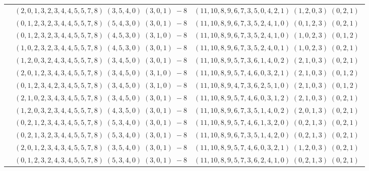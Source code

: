 \documentclass[11pt]{article}
\begin{document}
\begin{longtable}[l]{|c|c|c|}
 \cline{2-3} 
 & $(2 ,0 ,1 ,3 ,2 ,3 ,4 ,4 ,5 ,5 ,7 ,8) \;(3 ,5 ,4 ,0) \;(3 ,0 ,1) \;-8$ & $(11 ,10 ,8 ,9 ,6 ,7 ,3 ,5 ,0 ,4 ,2 ,1) \;(1 ,2 ,0 ,3) \;(0 ,2 ,1) \;$\\ 
 \cline{2-3} 
 & $(0 ,1 ,2 ,3 ,2 ,3 ,4 ,4 ,5 ,5 ,7 ,8) \;(5 ,4 ,3 ,0) \;(3 ,0 ,1) \;-8$ & $(11 ,10 ,8 ,9 ,6 ,7 ,3 ,5 ,2 ,4 ,1 ,0) \;(0 ,1 ,2 ,3) \;(0 ,2 ,1) \;$\\ 
 \cline{2-3} 
 & $(0 ,1 ,2 ,3 ,2 ,3 ,4 ,4 ,5 ,5 ,7 ,8) \;(4 ,5 ,3 ,0) \;(3 ,1 ,0) \;-8$ & $(11 ,10 ,8 ,9 ,6 ,7 ,3 ,5 ,2 ,4 ,1 ,0) \;(1 ,0 ,2 ,3) \;(0 ,1 ,2) \;$\\ 
 \cline{2-3} 
 & $(1 ,0 ,2 ,3 ,2 ,3 ,4 ,4 ,5 ,5 ,7 ,8) \;(4 ,5 ,3 ,0) \;(3 ,0 ,1) \;-8$ & $(11 ,10 ,8 ,9 ,6 ,7 ,3 ,5 ,2 ,4 ,0 ,1) \;(1 ,0 ,2 ,3) \;(0 ,2 ,1) \;$\\ 
 \cline{2-3} 
 & $(1 ,2 ,0 ,3 ,2 ,4 ,3 ,4 ,5 ,5 ,7 ,8) \;(3 ,4 ,5 ,0) \;(3 ,0 ,1) \;-8$ & $(11 ,10 ,8 ,9 ,5 ,7 ,3 ,6 ,1 ,4 ,0 ,2) \;(2 ,1 ,0 ,3) \;(0 ,2 ,1) \;$\\ 
 \cline{2-3} 
 & $(2 ,0 ,1 ,2 ,3 ,4 ,3 ,4 ,5 ,5 ,7 ,8) \;(3 ,4 ,5 ,0) \;(3 ,1 ,0) \;-8$ & $(11 ,10 ,8 ,9 ,5 ,7 ,4 ,6 ,0 ,3 ,2 ,1) \;(2 ,1 ,0 ,3) \;(0 ,1 ,2) \;$\\ 
 \cline{2-3} 
 & $(0 ,1 ,2 ,3 ,4 ,2 ,3 ,4 ,5 ,5 ,7 ,8) \;(3 ,4 ,5 ,0) \;(3 ,1 ,0) \;-8$ & $(11 ,10 ,8 ,9 ,4 ,7 ,3 ,6 ,2 ,5 ,1 ,0) \;(2 ,1 ,0 ,3) \;(0 ,1 ,2) \;$\\ 
 \cline{2-3} 
 & $(2 ,1 ,0 ,2 ,3 ,4 ,3 ,4 ,5 ,5 ,7 ,8) \;(3 ,4 ,5 ,0) \;(3 ,0 ,1) \;-8$ & $(11 ,10 ,8 ,9 ,5 ,7 ,4 ,6 ,0 ,3 ,1 ,2) \;(2 ,1 ,0 ,3) \;(0 ,2 ,1) \;$\\ 
 \cline{2-3} 
 & $(1 ,2 ,0 ,3 ,2 ,3 ,4 ,4 ,5 ,5 ,7 ,8) \;(4 ,3 ,5 ,0) \;(3 ,0 ,1) \;-8$ & $(11 ,10 ,8 ,9 ,6 ,7 ,3 ,5 ,1 ,4 ,0 ,2) \;(2 ,0 ,1 ,3) \;(0 ,2 ,1) \;$\\ 
 \cline{2-3} 
 & $(0 ,2 ,1 ,2 ,3 ,4 ,3 ,4 ,5 ,5 ,7 ,8) \;(5 ,3 ,4 ,0) \;(3 ,0 ,1) \;-8$ & $(11 ,10 ,8 ,9 ,5 ,7 ,4 ,6 ,1 ,3 ,2 ,0) \;(0 ,2 ,1 ,3) \;(0 ,2 ,1) \;$\\ 
 \cline{2-3} 
 & $(0 ,2 ,1 ,3 ,2 ,3 ,4 ,4 ,5 ,5 ,7 ,8) \;(5 ,3 ,4 ,0) \;(3 ,0 ,1) \;-8$ & $(11 ,10 ,8 ,9 ,6 ,7 ,3 ,5 ,1 ,4 ,2 ,0) \;(0 ,2 ,1 ,3) \;(0 ,2 ,1) \;$\\ 
 \cline{2-3} 
 & $(2 ,0 ,1 ,2 ,3 ,4 ,3 ,4 ,5 ,5 ,7 ,8) \;(3 ,5 ,4 ,0) \;(3 ,0 ,1) \;-8$ & $(11 ,10 ,8 ,9 ,5 ,7 ,4 ,6 ,0 ,3 ,2 ,1) \;(1 ,2 ,0 ,3) \;(0 ,2 ,1) \;$\\ 
 \cline{2-3} 
 & $(0 ,1 ,2 ,3 ,2 ,4 ,3 ,4 ,5 ,5 ,7 ,8) \;(5 ,3 ,4 ,0) \;(3 ,0 ,1) \;-8$ & $(11 ,10 ,8 ,9 ,5 ,7 ,3 ,6 ,2 ,4 ,1 ,0) \;(0 ,2 ,1 ,3) \;(0 ,2 ,1) \;$\\ 

\end{longtable}
\end{document}
